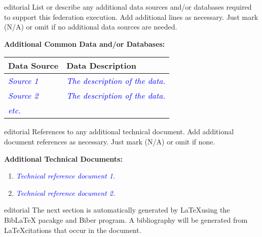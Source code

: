 \documentclass[11pt,english,letterpaper]{article}
\newcommand{\example}[1]{{\textcolor{blue}{\textit{#1}}}}
\begin{document}
\begin{shownto}{editorial}
{\color{red} List or describe any additional data sources and/or databases
required to support this federation execution. Add additional lines as
necessary. Just mark (N/A) or omit if no additional data sources are needed.}
\end{shownto}

\textbf{Additional Common Data and/or Databases: }

\begin{tabularx}{\textwidth}{|l|X|} \hline
\textbf{Data Source} & \textbf{Data Description} \\ \hline
\example{Source 1} & 
\example{The description of the data.} \\ \hline
\example{Source 2} & 
\example{The description of the data.} \\ \hline
\example{etc.} &  \\ \hline
\end{tabularx}

\begin{shownto}{editorial}
{\color{red} References to any additional technical document. Add additional
document references as necessary. Just mark (N/A) or omit if none.}
\end{shownto}

\textbf{Additional Technical Documents: }
\begin{enumerate}
\item \example{Technical reference document 1.}
\item \example{Technical reference document 2.}
\end{enumerate}

\begin{shownto}{editorial}
{\color{red} The next section is automatically generated by \LaTeX using the
BibLaTeX pacakge and Biber program.  A bibliography will be generated from
\LaTeX citations that occur in the document.}
\end{shownto}


\printbibliography
\end{document}
